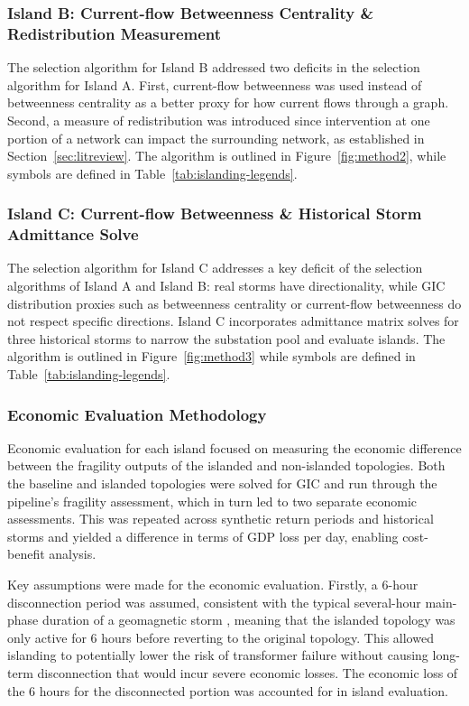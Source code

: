 \documentclass[draft]{agujournal2019}
\begin{document}
\subsubsection{Island B: Current-flow Betweenness Centrality \& Redistribution Measurement}\label{sec:methodB}

The selection algorithm for Island B addressed two deficits in the selection algorithm for Island A. First, current-flow betweenness was used instead of betweenness centrality as a better proxy for how current flows through a graph. Second, a measure of redistribution was introduced since intervention at one portion of a network can impact the surrounding network, as established in Section~\ref{sec:litreview}. The algorithm is outlined in Figure~\ref{fig:method2}, while symbols are defined in Table~\ref{tab:islanding-legends}.


\subsubsection{Island C: Current-flow Betweenness \& Historical Storm Admittance Solve}\label{sec:methodC}
The selection algorithm for Island C addresses a key deficit of the selection algorithms of Island A and Island B: real storms have directionality, while GIC distribution proxies such as betweenness centrality or current-flow betweenness do not respect specific directions. Island C incorporates admittance matrix solves for three historical storms to narrow the substation pool and evaluate islands. The algorithm is outlined in Figure~\ref{fig:method3} while symbols are defined in Table~\ref{tab:islanding-legends}.

\subsubsection{Economic Evaluation Methodology}

Economic evaluation for each island focused on measuring the economic difference between the fragility outputs of the islanded and non-islanded topologies. Both the baseline and islanded topologies were solved for GIC and run through the pipeline's fragility assessment, which in turn led to two separate economic assessments. This was repeated across synthetic return periods and historical storms and yielded a difference in terms of GDP loss per day, enabling cost-benefit analysis.

Key assumptions were made for the economic evaluation. Firstly, a 6-hour disconnection period was assumed, consistent with the typical several-hour main-phase duration of a geomagnetic storm \cite{gonzalez1994geomagnetic}, meaning that the islanded topology was only active for 6 hours before reverting to the original topology. This allowed islanding to potentially lower the risk of transformer failure without causing long-term disconnection that would incur severe economic losses. The economic loss of the 6 hours for the disconnected portion was accounted for in island evaluation.
\end{document}
